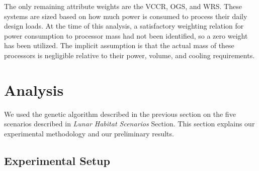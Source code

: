 \documentclass[submit]{aiaa}
\begin{document}
The only remaining attribute weights are the VCCR, OGS, and WRS. These systems are sized
based on how much power is consumed to process their daily design
loads. At the time of this analysis, a satisfactory weighting relation
for power consumption to processor mass had not been identified, so a
zero weight has been utilized. The  implicit assumption is that the
actual mass of these processors is negligible relative to their power,
volume, and cooling requirements.

\section{Analysis}
\label{sec:analysis}

We used the genetic algorithm described in the previous section on the
five scenarios described in \emph{Lunar Habitat Scenarios} Section.
This section
explains our experimental methodology and our preliminary results.  

\subsection{Experimental Setup}
\end{document}
